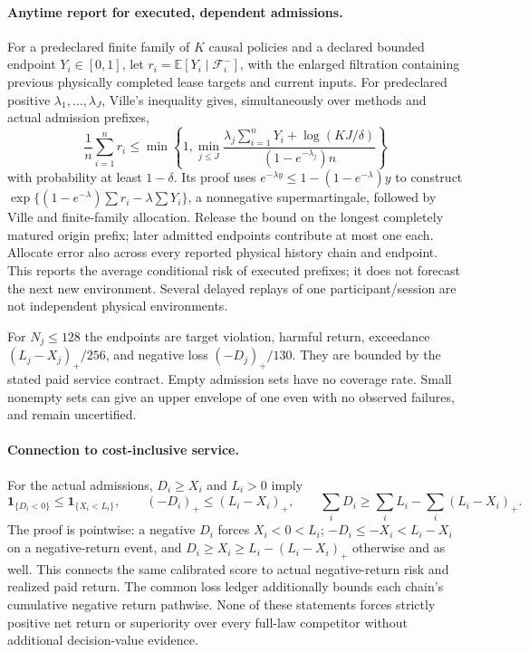 \paragraph{Anytime report for executed, dependent admissions.}
For a predeclared finite family of $K$ causal policies and a declared
bounded endpoint $Y_i\in[0,1]$, let
$r_i=\mathbb E[Y_i\mid\mathcal F_i^-]$, with the enlarged filtration
containing previous physically completed lease targets and current inputs.
For predeclared positive $\lambda_1,\ldots,\lambda_J$, Ville's inequality
gives, simultaneously over methods and actual admission prefixes,
\begin{equation}
 \frac1n\sum_{i=1}^n r_i\leq
 \min\left\{1,\min_{j\leq J}
 \frac{\lambda_j\sum_{i=1}^nY_i+\log(KJ/\delta)}
 {(1-e^{-\lambda_j})n}\right\}
 \label{eq:conditional-score-admission-envelope}
\end{equation}
with probability at least $1-\delta$. Its proof uses
$e^{-\lambda y}\leq1-(1-e^{-\lambda})y$ to construct
$\exp\{(1-e^{-\lambda})\sum r_i-\lambda\sum Y_i\}$,
a nonnegative supermartingale, followed by Ville and finite-family
allocation. Release the bound on the longest completely matured origin
prefix; later admitted endpoints contribute at most one each.
Allocate error also across every reported physical history chain and
endpoint. This reports the average conditional risk of executed prefixes;
it does not forecast the next new environment. Several delayed replays
of one participant/session are not independent physical environments.

For $N_j\leq128$ the endpoints are target violation, harmful return,
exceedance $(L_j-X_j)_+/256$, and negative loss $(-D_j)_+/130$.
They are bounded by the stated paid service contract. Empty admission
sets have no coverage rate. Small nonempty sets can give an upper envelope
of one even with no observed failures, and remain uncertified.

\paragraph{Connection to cost-inclusive service.}
For the actual admissions, $D_i\geq X_i$ and $L_i>0$ imply
\begin{equation}
 \mathbf1_{\{D_i<0\}}\leq\mathbf1_{\{X_i<L_i\}},\qquad
 (-D_i)_+\leq(L_i-X_i)_+,\qquad
 \sum_iD_i\geq\sum_iL_i-\sum_i(L_i-X_i)_+.
 \label{eq:conditional-calibration-paid-link}
\end{equation}
The proof is pointwise: a negative $D_i$ forces $X_i<0<L_i$;
$-D_i\leq-X_i<L_i-X_i$ on a negative-return event, and
$D_i\geq X_i\geq L_i-(L_i-X_i)_+$ otherwise and as well.
This connects the same calibrated score to actual negative-return risk
and realized paid return. The common loss ledger additionally bounds
each chain's cumulative negative return pathwise. None of these statements
forces strictly positive net return or superiority over every full-law
competitor without additional decision-value evidence.
